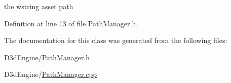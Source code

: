the wstring asset path 



Definition at line 13 of file Path\+Manager.\+h.



The documentation for this class was generated from the following files\+:\begin{DoxyCompactItemize}
\item 
D3d\+Engine/\mbox{\hyperlink{_path_manager_8h}{Path\+Manager.\+h}}\item 
D3d\+Engine/\mbox{\hyperlink{_path_manager_8cpp}{Path\+Manager.\+cpp}}\end{DoxyCompactItemize}
